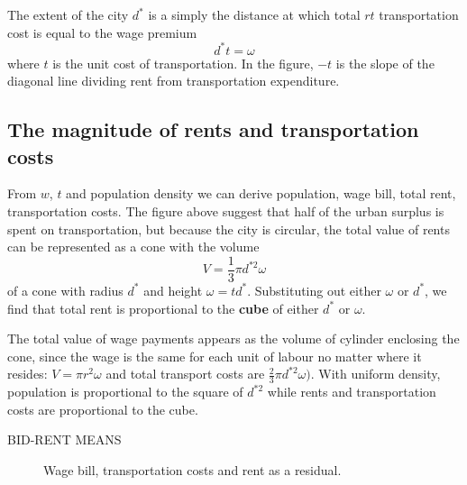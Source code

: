 The extent  of the city  $d^*$ is a simply the distance at which total $rt$ transportation cost  is equal to the wage premium
\[d^* t= \omega\]
where $t$ is the unit cost of transportation. In the figure, $-t$ is the slope of the diagonal line dividing rent from transportation expenditure.

 \subsection{The magnitude of rents and transportation costs}
 From $w$, $t$ and population density we can derive population, wage bill, total rent, transportation costs. The figure above suggest that  half of the urban surplus is spent on transportation, but because the city is circular, the total value of rents can be represented as  a cone with the volume  \[ V=\frac{1}{3}\pi  d^{*2} \omega \]
of a cone with radius $d^*$ and  height $\omega = td^*$. Substituting out either  $\omega$ or  $d^*$, we find that total rent is  proportional to the \textbf{cube} of either  $d^*$ or $\omega$. 

The total value of wage payments appears as the volume of cylinder enclosing the cone, since the wage is the same for each unit of labour no matter where it resides: 
$V=\pi r^2 \omega$ 
and total transport costs are 
$\frac{2}{3}\pi  d^{*2} \omega).$
With uniform density, population is proportional to the square of  $d^{*2}$ while rents and  transportation costs are proportional to the cube. %

BID-RENT MEANS


\begin{figure}
    \begin{center}
    
    \caption{Wage bill, transportation costs and rent as a residual.}
    \label{fig-city-conical}
    \end{center}
\end{figure}


